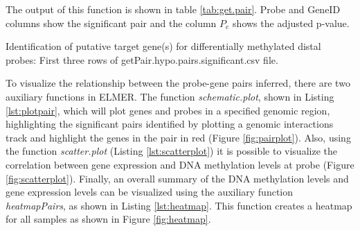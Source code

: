 

The output of this function is shown in table \ref{tab:get.pair}. Probe and GeneID
columns show the significant pair and the column $P_e$ shows the adjusted p-value.
\begin{table}[h!]
\centering
\small
{}
\caption [Identification of putative target gene(s) for differentially methylated distal probes]{
Identification of putative target gene(s) for differentially methylated distal probes: First three rows of  getPair.hypo.pairs.significant.csv file.
}
\label{tab:get.pair}
\end{table}

To visualize the relationship between the probe-gene pairs inferred, there are two auxiliary functions in ELMER. The function \textit{schematic.plot}, shown in Listing \ref{lst:plotpair}, which will plot genes and probes in a specified genomic region, highlighting the significant pairs identified by plotting a genomic interactions track and highlight the genes in the pair in red (Figure \ref{fig:pairplot}). Also,  using the function \textit{scatter.plot} (Listing \ref{lst:scatterplot}) it is possible to visualize the correlation between gene expression and DNA methylation levels at probe (Figure \ref{fig:scatterplot}).
 Finally, an overall summary of the DNA  methylation levels and gene expression levels  can be visualized using the auxiliary function \textit{heatmapPairs}, as shown in Listing \ref{lst:heatmap}. This function creates a heatmap for all samples  as shown in Figure \ref{fig:heatmap}.



